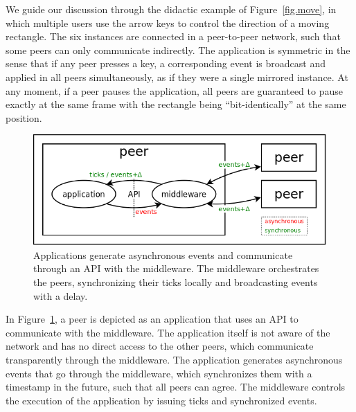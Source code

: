 \documentclass[10pt,journal,compsoc]{IEEEtran}
\begin{document}
We guide our discussion through the didactic example of Figure~\ref{fig.move},
in which multiple users use the arrow keys to control the direction of a
moving rectangle.
The six instances are connected in a peer-to-peer network, such that some
peers can only communicate indirectly.
%
The application is symmetric in the sense that if any peer presses a key, a
corresponding event is broadcast and applied in all peers simultaneously, as
if they were a single mirrored instance.
At any moment, if a peer pauses the application, all peers are guaranteed to
pause exactly at the same frame with the rectangle being ``bit-identically'' at
the same position.

\begin{figure}[t]
  \centering
  \includegraphics[width=\linewidth]{middleware}
  \caption{
    Applications generate asynchronous events and communicate through an API
    with the middleware.
    The middleware orchestrates the peers, synchronizing their ticks locally
    and broadcasting events with a delay.
    \label{fig.middleware}
  }
\end{figure}

In Figure~\ref{fig.middleware}, a peer is depicted as an application that uses
an API to communicate with the middleware.
The application itself is not aware of the network and has no direct access to
the other peers, which communicate transparently through the middleware.
The application generates asynchronous events that go through the middleware,
which synchronizes them with a timestamp in the future, such that all peers can
agree.
The middleware controls the execution of the application by issuing ticks and
synchronized events.
\end{document}
